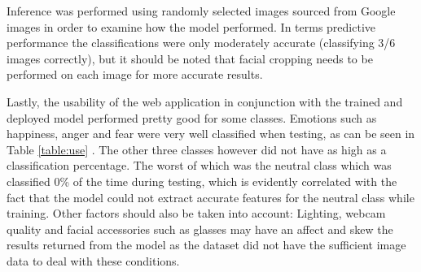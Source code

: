 Inference was performed using randomly selected images sourced from Google images in order to examine how the model performed. In terms predictive performance the classifications were only moderately accurate (classifying 3/6 images correctly), but it should be noted that facial cropping needs to be performed on each image for more accurate results.

Lastly, the usability of the web application in conjunction with the trained and deployed model performed pretty good for some classes. Emotions such as happiness, anger and fear were very well classified when testing, as can be seen in Table \ref{table:use} . The other three classes however did not have as high as a classification percentage. The worst of which was the neutral class which was classified 0\% of the time during testing, which is evidently correlated with the fact that the model could not extract accurate features for the neutral class while training. Other factors should also be taken into account: Lighting, webcam quality and facial accessories such as glasses may have an affect and skew the results returned from the model as the dataset did not have the sufficient image data to deal with these conditions.



